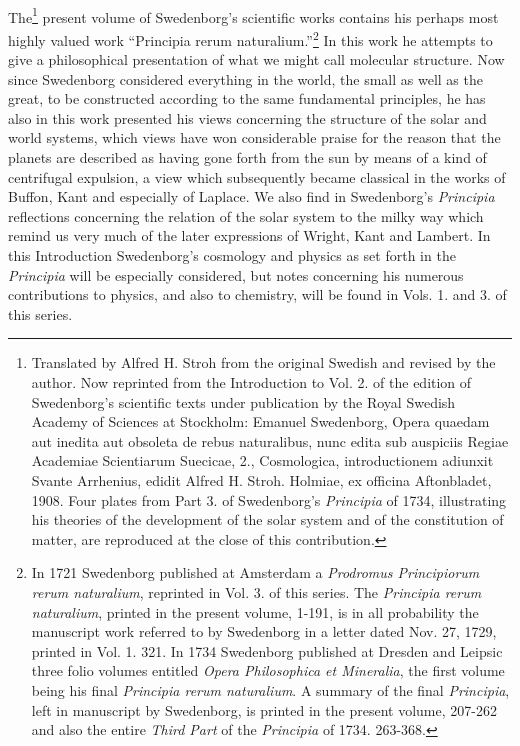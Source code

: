 \documentclass[a4paper, 11pt, oneside, polutonikogreek, english]{article}
\begin{document}
\clearpage
\setlength{\parskip}{1mm plus1mm minus1mm}
\paragraph{}
The\footnote{Translated by Alfred H. Stroh from the original Swedish and revised by the author. Now reprinted from the Introduction to Vol. 2. of the edition of Swedenborg's scientific texts under publication by the Royal Swedish Academy of Sciences at Stockholm: Emanuel Swedenborg, Opera quaedam aut inedita aut obsoleta de rebus naturalibus, nunc edita sub auspiciis Regiae Academiae Scientiarum Suecicae, 2., Cosmologica, introductionem adiunxit Svante Arrhenius, edidit Alfred H. Stroh. Holmiae, ex officina Aftonbladet, 1908. Four plates from Part 3. of Swedenborg's \emph{Principia} of 1734, illustrating his theories of the development of the solar system and of the constitution of matter, are reproduced at the close of this contribution.} present volume of Swedenborg's scientific works contains his perhaps most highly valued work ``Principia rerum naturalium.''\footnote{In 1721 Swedenborg published at Amsterdam a \emph{Prodromus Principiorum rerum naturalium}, reprinted in Vol. 3. of this series. The \emph{Principia rerum naturalium}, printed in the present volume, 1-191, is in all probability the manuscript work referred to by Swedenborg in a letter dated Nov. 27, 1729, printed in Vol. 1. 321. In 1734 Swedenborg published at Dresden and Leipsic three folio volumes entitled \emph{Opera Philosophica et Mineralia}, the first volume being his final \emph{Principia rerum naturalium}. A summary of the final \emph{Principia}, left in manuscript by Swedenborg, is printed in the present volume, 207-262 and also the entire \emph{Third Part} of the \emph{Principia} of 1734. 263-368.} In this work he attempts to give a philosophical presentation of what we might call molecular structure. Now since Swedenborg considered everything in the world, the small as well as the great, to be constructed according to the same fundamental principles, he has also in this work presented his views concerning the structure of the solar and world systems, which views have won considerable praise for the reason that the planets are described as having gone forth from the sun by means of a kind of centrifugal expulsion, a view which subsequently became classical in the works of Buffon, Kant and especially of Laplace. We also find in Swedenborg's \emph{Principia} reflections concerning the relation of the solar system to the milky way which remind us very much of the later expressions of Wright, Kant and Lambert. In this Introduction Swedenborg's cosmology and physics as set forth in the \emph{Principia} will be especially considered, but notes concerning his numerous contributions to physics, and also to chemistry, will be found in Vols. 1. and 3. of this series.
\end{document}
